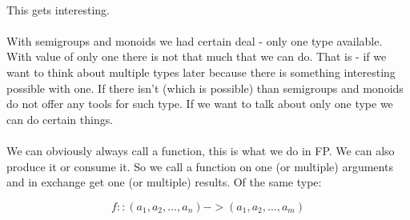 \documentclass{article}
\begin{document}
    \paragraph{}
    This gets interesting. 
    \paragraph{}
    With semigroups and monoids we had certain deal - only one type available. With value of only one there is not that much that we can do. That is - if we want to think about multiple types later because there is something interesting possible with one. If there isn't (which is possible) than semigroups and monoids do not offer any tools for such type. If we want to talk about only one type we can do certain things.
    \paragraph{}
    We can obviously always call a function, this is what we do in FP. We can also produce it or consume it. So we call a function on one (or multiple) arguments and in exchange get one (or multiple) results. Of the same type:

    \begin{equation}
        f :: (a_1, a_2, ..., a_n) -> (a_1, a_2, ..., a_m)
    \end{equation}
\end{document}
